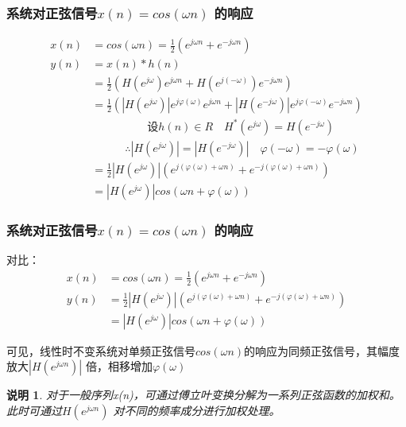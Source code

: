 \documentclass[notheorems,compress,mathserif,table]{beamer}
\newtheorem{shuoming}{说明}
\begin{document}
\begin{frame}[shrink]\frametitle{系统对正弦信号$x(n)=cos(\omega n)$ 的响应}%
\begin{equation*}
\begin{split}
x(n)      &= cos(\omega n) = \frac{1}{2}(e^{j\omega n}+e^{-j\omega n}) \\
y(n)      &= x(n)*h(n)\\
&= \frac{1}{2}\left(H(e^{j\omega})e^{j\omega n}+ H(e^{j(-\omega)})e^{-j\omega n}\right)\\
&= \frac{1}{2}\left(|H(e^{j\omega})|e^{j\varphi(\omega)}e^{j\omega n}+|H(e^{-j\omega})|e^{j\varphi(-\omega)}e^{-j\omega n}\right) \\
&\quad  \quad\quad\quad\quad\mbox{设}  h(n)\in R\quad H^{*}(e^{j\omega})=H(e^{-j\omega}) \\
&\quad  \quad\quad\therefore |H(e^{j\omega})| = |H(e^{-j\omega})|\quad \varphi(-\omega) = -\varphi(\omega) \\
&= \frac{1}{2}|H(e^{j\omega})|\left(e^{j(\varphi(\omega)+\omega n)}+e^{-j(\varphi(\omega)+\omega n)}\right)\\
&= |H(e^{j\omega})|cos(\omega n +\varphi(\omega))
\end{split}
\end{equation*}
\end{frame}


\begin{frame}[shrink]\frametitle{系统对正弦信号$x(n)=cos(\omega n)$ 的响应}%
对比：
\begin{equation*}
\begin{split}
x(n)      &= cos(\omega n) = \frac{1}{2}(e^{j\omega n}+e^{-j\omega n}) \\
y(n)
&= \frac{1}{2}|H(e^{j\omega})|\left(e^{j(\varphi(\omega)+\omega n)}+e^{-j(\varphi(\omega)+\omega n)}\right)\\
&= |H(e^{j\omega})|cos(\omega n +\varphi(\omega))
\end{split}
\end{equation*}

可见，线性时不变系统对单频正弦信号$cos(\omega n)$的响应为同频正弦信号，其幅度放大$|H(e^{j\omega n})|$ 倍，相移增加$\varphi(\omega)$

\begin{shuoming}
对于一般序列x(n)，可通过傅立叶变换分解为一系列正弦函数的加权和。此时可通过$H(e^{j\omega n})$ 对不同的频率成分进行加权处理。
\end{shuoming}
\end{frame}
\end{document}
